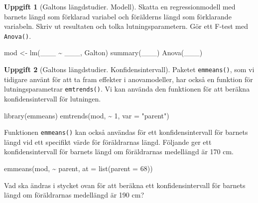\documentclass[
]{book}
\newenvironment{Shaded}{\begin{snugshade}}{\end{snugshade}}
\newcommand{\AttributeTok}[1]{\textcolor[rgb]{0.77,0.63,0.00}{#1}}
\newcommand{\DecValTok}[1]{\textcolor[rgb]{0.00,0.00,0.81}{#1}}
\newcommand{\FunctionTok}[1]{\textcolor[rgb]{0.00,0.00,0.00}{#1}}
\newcommand{\NormalTok}[1]{#1}
\newcommand{\OtherTok}[1]{\textcolor[rgb]{0.56,0.35,0.01}{#1}}
\newcommand{\SpecialCharTok}[1]{\textcolor[rgb]{0.00,0.00,0.00}{#1}}
\newcommand{\StringTok}[1]{\textcolor[rgb]{0.31,0.60,0.02}{#1}}
\theoremstyle{definition}
\theoremstyle{definition}
\theoremstyle{definition}
\newtheorem{exercise}{Uppgift}[chapter]
\theoremstyle{definition}
\theoremstyle{remark}
\begin{document}
\begin{exercise}[Galtons längdstudier. Modell]

Skatta en regressionmodell med barnets längd som förklarad variabel och förälderns längd som förklarande variabeln. Skriv ut resultaten och tolka lutningsparametern. Gör ett F-test med \texttt{Anova()}.

\begin{Shaded}
\begin{Highlighting}[]
\NormalTok{mod }\OtherTok{\textless{}{-}} \FunctionTok{lm}\NormalTok{(\_\_\_ }\SpecialCharTok{\textasciitilde{}}\NormalTok{ \_\_\_, Galton)}
\FunctionTok{summary}\NormalTok{(\_\_\_)}
\FunctionTok{Anova}\NormalTok{(\_\_\_)}
\end{Highlighting}
\end{Shaded}

\end{exercise}

\begin{exercise}[Galtons längdstudier. Konfidensintervall]
Paketet \texttt{emmeans()}, som vi tidigare använt för att ta fram effekter i anovamodeller, har också en funktion för lutningsparametrar \texttt{emtrends()}. Vi kan använda den funktionen för att beräkna konfidensintervall för lutningen.

\begin{Shaded}
\begin{Highlighting}[]
\FunctionTok{library}\NormalTok{(emmeans)}
\FunctionTok{emtrends}\NormalTok{(mod, }\SpecialCharTok{\textasciitilde{}} \DecValTok{1}\NormalTok{, }\AttributeTok{var =} \StringTok{"parent"}\NormalTok{)}
\end{Highlighting}
\end{Shaded}

Funktionen \texttt{emmeans()} kan också användas för ett konfidensintervall för barnets längd vid ett specifikt värde för föräldrarnas längd. Följande ger ett konfidensintervall för barnets längd om föräldrarnas medellängd är 170 cm.

\begin{Shaded}
\begin{Highlighting}[]
\FunctionTok{emmeans}\NormalTok{(mod, }\SpecialCharTok{\textasciitilde{}}\NormalTok{ parent, }\AttributeTok{at =} \FunctionTok{list}\NormalTok{(}\AttributeTok{parent =} \DecValTok{68}\NormalTok{))}
\end{Highlighting}
\end{Shaded}

Vad ska ändras i stycket ovan för att beräkna ett konfidensintervall för barnets längd om föräldrarnas medellängd är 190 cm?
\end{exercise}
\end{document}
